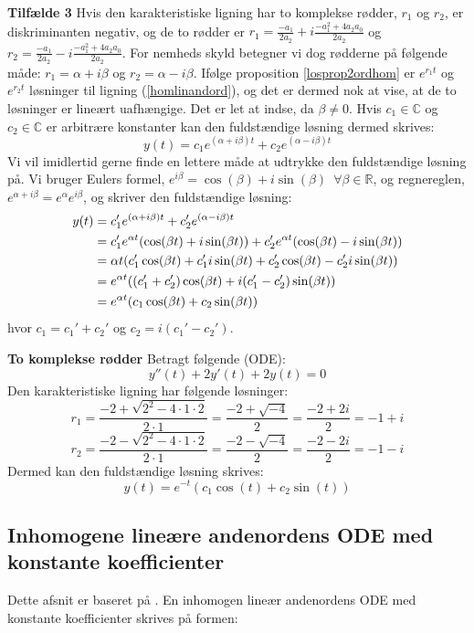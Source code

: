 \hfill \break
\textbf{Tilfælde 3}\hfill \break
Hvis den karakteristiske ligning har to komplekse rødder, $r_1$ og $r_2$, er diskriminanten negativ, og de to rødder er $r_1=\frac{-a_1}{2a_2}+i\frac{-a_1^2+4a_2a_0}{2a_2}$ og $r_2=\frac{-a_1}{2a_2}-i\frac{-a_1^2+4a_2a_0}{2a_2}$. For nemheds skyld betegner vi dog rødderne på følgende måde: $r_1=\alpha+i\beta$ og $r_2=\alpha-i\beta$. Ifølge proposition \ref{losprop2ordhom} er $e^{r_1t}$ og $e^{r_2t}$ løsninger til ligning (\ref{homlinandord}), og det er dermed nok at vise, at de to løsninger er lineært uafhængige. Det er let at indse, da $\beta \neq 0$. Hvis $c_1\in \mathbb{C}$ og $c_2 \in \mathbb{C}$ er arbitrære konstanter kan den fuldstændige løsning dermed skrives:\hfill \break
$$y(t)=c_1e^{(\alpha+i\beta)t}+c_2e^{(\alpha-i\beta)t}$$ \hfill \break
Vi vil imidlertid gerne finde en lettere måde at udtrykke den fuldstændige løsning på. Vi bruger Eulers formel\citep[s. 27]{JAB}, $e^{i\beta}=\cos(\beta)+i\sin(\beta) \enspace \forall \beta \in \mathbb{R}$, og regnereglen, $e^{\alpha+i\beta}=e^{\alpha}e^{i\beta}$, og skriver den fuldstændige løsning:\hfill \break
\begin{align}
y(t)&=c_1'e^{(\alpha+i\beta)t}+c_2'e^{(\alpha-i\beta)t} \notag \\
&=c_1'e^{\alpha t}(\cos(\beta t)+i\sin(\beta t))+c_2'e^{\alpha t}(\cos(\beta t)-i\sin(\beta t)) \notag \\
&={\alpha t}(c_1'\cos(\beta t)+c_1'i\sin(\beta t)+c_2'\cos(\beta t)-c_2'i\sin(\beta t)) \notag \\
&=e^{\alpha t}((c_1'+c_2')\cos(\beta t)+i(c_1'-c_2')\sin(\beta t)) \notag \\
&=e^{\alpha t}(c_1\cos(\beta t)+c_2\sin(\beta t)) 
\end{align}
hvor $c_1=c_1'+c_2'$ og $c_2=i(c_1'-c_2')$.\hfill \break
\begin{Example}\textbf{To komplekse rødder} \hfill \break
\textnormal{Betragt følgende (ODE):}\hfill \break
$$y''(t)+2y'(t)+2y(t)=0$$\hfill \break
\textnormal{Den karakteristiske ligning har følgende løsninger:} \hfill \break
$$r_1=\frac{-2+\sqrt{2^2-4\cdot 1\cdot 2}}{2\cdot 1}=\frac{-2+\sqrt{-4}}{2}=\frac{-2+2i}{2}=-1+i$$
$$r_2=\frac{-2-\sqrt{2^2-4\cdot 1\cdot 2}}{2\cdot 1}=\frac{-2-\sqrt{-4}}{2}=\frac{-2-2i}{2}=-1-i$$\hfill \break
\textnormal{Dermed kan den fuldstændige løsning skrives:}\hfill \break
$$y(t)=e^{-t}(c_1\cos(t)+c_2\sin(t))$$
\end{Example}


\subsection{Inhomogene lineære andenordens ODE med konstante koefficienter}
Dette afsnit er baseret på \citep[s. 240-246]{JAB}.\hfill \break
En inhomogen lineær andenordens ODE med konstante koefficienter skrives på formen:

